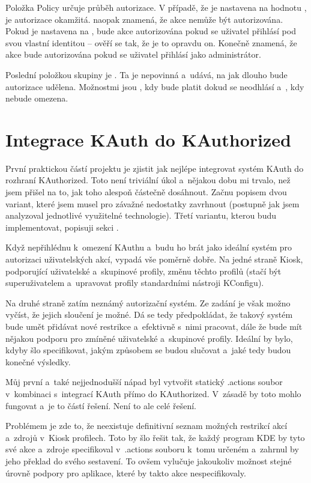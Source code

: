 Položka Policy určuje průběh autorizace. V případě, že je nastavena na hodnotu , je autorizace okamžitá.  naopak znamená, že akce nemůže být autorizována. Pokud je nastavena na , bude akce autorizována pokud se uživatel přihlásí pod svou vlastní identitou -- ověří se tak, že je to opravdu on. Konečně  znamená, že akce bude autorizována pokud se uživatel přihlásí jako administrátor.

Poslední položkou skupiny je . Ta je nepovinná a~udává, na jak dlouho bude autorizace udělena. Možnostmi jsou , kdy bude platit dokud se neodhlásí a~, kdy nebude omezena.

\chapter{Integrace KAuth do KAuthorized}
První praktickou částí projektu je zjistit jak nejlépe integrovat systém KAuth do rozhraní KAuthorized. Toto není triviální úkol a~nějakou dobu mi trvalo, než jsem přišel na to, jak toho alespoň částečně dosáhnout. Začnu popisem dvou variant, které jsem musel pro závažné nedostatky zavrhnout (postupně jak jsem analyzoval jednotlivé  využitelné technologie). Třetí variantu, kterou budu implementovat, popisuji sekci .

Když nepřihlédnu k~omezení KAuthu a~budu ho brát jako ideální systém pro autorizaci uživatelských akcí, vypadá vše poměrně dobře. Na jedné straně Kiosk, podporující uživatelské a~skupinové profily, změnu těchto profilů (stačí být superuživatelem a~upravovat profily standardními nástroji KConfigu).

Na druhé straně zatím neznámý autorizační systém. Ze zadání je však možno vyčíst, že jejich sloučení je možné. Dá se tedy předpokládat, že takový systém bude umět přidávat nové restrikce a~efektivně s~nimi pracovat, dále že bude mít nějakou podporu pro zmíněné uživatelské a~skupinové profily. Ideální by bylo, kdyby šlo specifikovat, jakým způsobem se budou slučovat a~jaké tedy budou konečné výsledky.

Můj první a~také nejjednodušší nápad byl vytvořit statický .actions soubor v~kombinaci s~integrací KAuth přímo do KAuthorized. V~zásadě by toto mohlo fungovat a~je to částí řešení. Není to ale celé řešení.

Problémem je zde to, že neexistuje definitivní seznam možných restrikcí akcí a~zdrojů v~Kiosk profilech. Toto by šlo řešit tak, že každý program KDE by tyto své akce a~zdroje specifikoval v~.actions souboru k~tomu určeném a~zahrnul by jeho překlad do svého sestavení. To ovšem vylučuje jakoukoliv možnost stejné úrovně podpory pro aplikace, které by takto akce nespecifikovaly.

